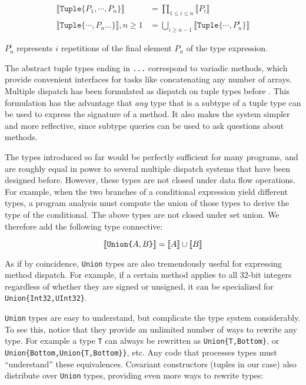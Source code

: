 \vspace{-3ex}
\begin{align*}
  \llbracket \texttt{Tuple\{}P_1,\cdots,P_n\texttt{\}} \rrbracket &= \prod_{1\leq i \leq n} \llbracket P_i \rrbracket \\
  \llbracket \texttt{Tuple\{}\cdots,P_n\texttt{...\}} \rrbracket, n\geq 1 &= \bigcup_{i\geq n-1} \llbracket \texttt{Tuple\{}\cdots,P_n^i\texttt{\}} \rrbracket
\end{align*}

\noindent
$P_n^i$ represents $i$ repetitions of the final element $P_n$ of the type expression.

The abstract tuple types ending in \texttt{...} correspond to variadic methods, which
provide convenient interfaces for tasks like concatenating any number of arrays.
Multiple dispatch has been formulated as dispatch on tuple types before \cite{Leavens1998}.
This formulation has the advantage that \emph{any} type that is a subtype of a
tuple type can be used to express the signature of a method. It also makes the system
simpler and more reflective, since subtype queries can be used to ask questions about
methods.

The types introduced so far would be perfectly sufficient for many programs, and are
roughly equal in power to several multiple dispatch systems that have been designed
before. However, these types are not closed under data flow operations. For example,
when the two branches of a conditional expression yield different types, a program
analysis must compute the union of those types to derive the type of the conditional.
The above types are not closed under set union. We therefore add the following
type connective:

\vspace{-3ex}
\[
  \llbracket \texttt{Union\{}A,B\texttt{\}} \rrbracket = \llbracket A \rrbracket \cup \llbracket B \rrbracket \\
\]

As if by coincidence, \texttt{Union} types are also tremendously useful for expressing
method dispatch. For example, if a certain method applies to all 32-bit integers regardless
of whether they are signed or unsigned, it can be specialized for \texttt{Union\{Int32,UInt32\}}.

\texttt{Union} types are easy to understand, but complicate the type system considerably.
To see this, notice that they provide an unlimited number of ways to rewrite any type.
For example a type \texttt{T} can always be rewritten as \texttt{Union\{T,Bottom\}}, or
\texttt{Union\{Bottom,Union\{T,Bottom\}\}}, etc. Any code that processes types must
``understand'' these equivalences. Covariant constructors (tuples in our case)
also distribute over \texttt{Union} types, providing even more ways to rewrite types:

